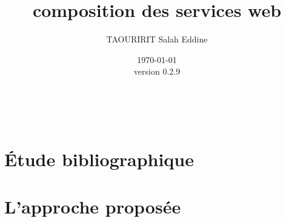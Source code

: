 \documentclass[a4paper, oneside, 12pt]{report}
\author{TAOURIRIT Salah Eddine}
\title{composition des services web}
\date{\today\\version 0.2.9}
\begin{document}
\let\Item\item \newcommand{\head}[1]{\textnormal{\textbf{#1}}}
\newcommand\SpecialItem{\renewcommand\item[1][]{\Item[\hspace{0.5cm}\textbullet~\sffamily ##1]}}
\newcommand\SpecialItemI{\renewcommand\item[1][]{\Item[\textendash~\sffamily ##1]}}

\renewcommand{\descriptionlabel}[1]{\hspace{0.5cm}\textbullet~\textsf{#1}}
\renewcommand\enddescription{\endlist\global\let\item\Item}

\renewcommand{\thesubsubsection}{} %
\newtheorem{mydef}{Definition}

\captionsetup[figure]{name=Figure.}
\captionsetup[table]{name=Table.}

\maketitle

\setcounter{secnumdepth}{4}
\setcounter{tocdepth}{2}

\tableofcontents

\printglossaries\
\listoffigures
\listoftables

\newpage
{}


\part{Étude bibliographique}



\part{L'approche proposée}






\begin{appendices}


\end{appendices}
\end{document}
